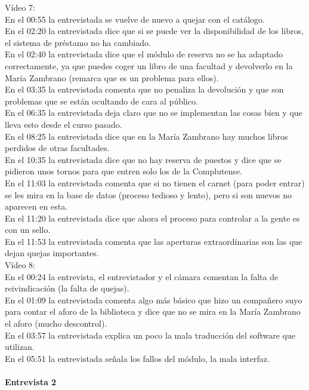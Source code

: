 \documentclass[12pt]{article}
\begin{document}
Vídeo 7: \\
En el 00:55 la entrevistada se vuelve de nuevo a quejar con el catálogo.\\
En el 02:20 la entrevistada dice que si se puede ver la disponibilidad de los libros, el sistema de préstamo no ha cambiado.\\
En el 02:40 la entrevistada dice que el módulo de reserva no se ha adaptado correctamente, ya que puedes coger un libro de una facultad y devolverlo en la María Zambrano (remarca que es un problema para ellos).\\
En el 03:35 la entrevistada comenta que no penaliza la devolución y que son problemas que se están ocultando de cara al público.\\
En el 06:35 la entrevistada deja claro que no se implementan las cosas bien y que lleva esto desde el curso pasado.\\
En el 08:25 la entrevistada dice que en la María Zambrano hay muchos libros perdidos de otras facultades.\\
En el 10:35 la entrevistada dice que no hay reserva de puestos y dice que se pidieron unos tornos para que entren solo los de la Complutense.\\
En el 11:03 la entrevistada comenta que si no tienen el carnet (para poder entrar) se les mira en la base de datos (proceso tedioso y lento), pero si son nuevos no aparecen en esta.\\
En el 11:20 la entrevistada dice que ahora el proceso para controlar a la gente es con un sello.\\
En el 11:53 la entrevistada comenta que las aperturas extraordinarias son las que dejan quejas importantes.\\

Vídeo 8:\\
En el 00:24 la entrevista, el entrevistador y el cámara comentan la falta de reivindicación (la falta de quejas).\\
En el 01:09 la entrevistada comenta algo más básico que hizo un compañero suyo para contar el aforo de la biblioteca y dice que no se mira en la María Zambrano el aforo (mucho descontrol).\\
En el 03:57 la entrevistada explica un poco la mala traducción del software que utilizan.\\
En el 05:51 la entrevistada señala los fallos del módulo, la mala interfaz.\\

\paragraph{Entrevista 2}
\end{document}
